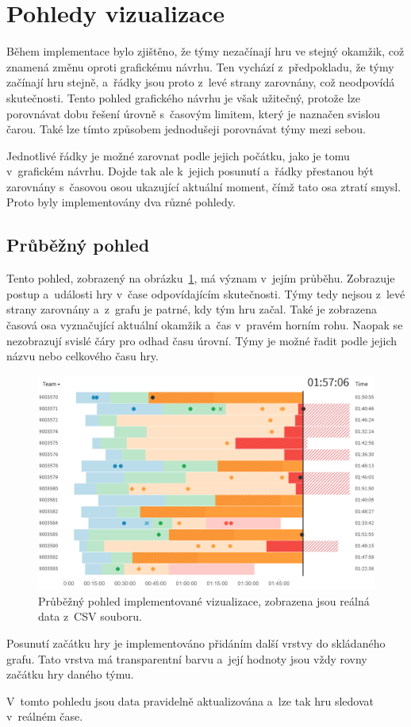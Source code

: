\documentclass[
  digital, %
  oneside, %
  table,   %
  nolof,     %
  nolot,     %
]{fithesis3}
\begin{document}
\section{Pohledy vizualizace}
Během implementace bylo zjištěno, že týmy nezačínají hru ve stejný okamžik, což znamená změnu oproti grafickému návrhu. Ten vychází z~předpokladu, že týmy začínají hru stejně, a~řádky jsou proto z~levé strany zarovnány, což neodpovídá skutečnosti. Tento pohled grafického návrhu je však užitečný, protože lze porovnávat dobu řešení úrovně s~časovým limitem, který je naznačen svislou čarou. Také lze tímto způsobem jednodušeji porovnávat týmy mezi sebou.\par
Jednotlivé řádky je možné zarovnat podle jejich počátku, jako je tomu v~grafickém návrhu. Dojde tak ale k~jejich posunutí a~řádky přestanou být zarovnány s~časovou osou ukazující aktuální moment, čímž tato osa ztratí smysl. Proto byly implementovány dva různé pohledy.

\subsection{Průběžný pohled}
Tento pohled, zobrazený na obrázku~\ref{fig:visualizationChartProgress}, má význam v~jejím průběhu. Zobrazuje postup a~události hry v~čase odpovídajícím skutečnosti. Týmy tedy nejsou z~levé strany zarovnány a~z~grafu je patrné, kdy tým hru začal. Také je zobrazena časová osa vyznačující aktuální okamžik a~čas v~pravém horním rohu. Naopak se nezobrazují svislé čáry pro odhad času úrovní. Týmy je možné řadit podle jejich názvu nebo celkového času hry.\par
\begin{figure}[H]
  \begin{center}
    \includegraphics[width=12.7cm]{images/vizualizace-progress.png}
  \end{center}
  \caption{Průběžný pohled implementované vizualizace, zobrazena jsou reálná data z~CSV souboru.}
  \label{fig:visualizationChartProgress}
\end{figure}
Posunutí začátku hry je implementováno přidáním další vrstvy do skládaného grafu. Tato vrstva má transparentní barvu a~její hodnoty jsou vždy rovny začátku hry daného týmu.\par
V~tomto pohledu jsou data pravidelně aktualizována a~lze tak hru sledovat v~reálném čase.
\end{document}
